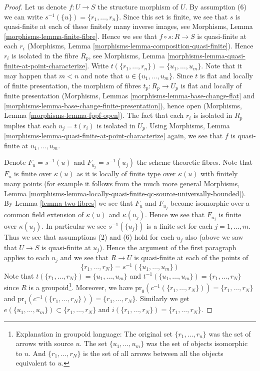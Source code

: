 \documentclass{stacks-project}
\theoremstyle{plain}
\theoremstyle{definition}
\theoremstyle{remark}
\numberwithin{equation}{subsection}
\begin{document}
\begin{proof}
Let us denote $f : U \to S$ the structure morphism of $U$.
By assumption (6) we can write $s^{-1}(\{u\}) = \{r_1, \ldots, r_n\}$.
Since this set is finite, we see that $s$ is quasi-finite at each of
these finitely many inverse images, see
Morphisms, Lemma \ref{morphisms-lemma-finite-fibre}.
Hence we see that $f \circ s : R \to S$ is quasi-finite at each $r_i$
(Morphisms, Lemma \ref{morphisms-lemma-composition-quasi-finite}).
Hence $r_i$ is isolated in the fibre $R_p$, see
Morphisms, Lemma \ref{morphisms-lemma-quasi-finite-at-point-characterize}.
Write $t(\{r_1, \ldots, r_n\}) = \{u_1, \ldots, u_m\}$.
Note that it may happen that $m < n$ and note that
$u \in \{u_1, \ldots, u_m\}$.
Since $t$ is flat and locally of finite presentation,
the morphism of fibres $t_p : R_p \to U_p$ is flat and locally of
finite presentation (Morphisms,
Lemmas \ref{morphisms-lemma-base-change-flat} and
\ref{morphisms-lemma-base-change-finite-presentation}),
hence open (Morphisms,
Lemma \ref{morphisms-lemma-fppf-open}).
The fact that each $r_i$ is isolated in $R_p$ implies that
each $u_j = t(r_i)$ is isolated in $U_p$. Using
Morphisms, Lemma \ref{morphisms-lemma-quasi-finite-at-point-characterize}
again, we see that $f$ is quasi-finite at $u_1, \ldots, u_m$.

\medskip\noindent
Denote $F_u = s^{-1}(u)$ and $F_{u_j} = s^{-1}(u_j)$ the scheme theoretic
fibres. Note that $F_u$ is finite over $\kappa(u)$ as it is locally of finite
type over $\kappa(u)$ with finitely many points (for example it follows from
the much more general
Morphisms, Lemma
\ref{morphisms-lemma-locally-quasi-finite-qc-source-universally-bounded}).
By
Lemma \ref{lemma-two-fibres}
we see that $F_u$ and $F_{u_j}$ become isomorphic over a common
field extension of $\kappa(u)$ and $\kappa(u_j)$. Hence we see
that $F_{u_j}$ is finite over $\kappa(u_j)$. In particular we see
$s^{-1}(\{u_j\})$ is a finite set for each $j = 1, \ldots, m$.
Thus we see that assumptions (2) and (6) hold for each $u_j$ also
(above we saw that $U \to S$ is quasi-finite at $u_j$).
Hence the argument of the first paragraph applies to each $u_j$
and we see that $R \to U$ is quasi-finite at each of the points of
$$
\{r_1, \ldots, r_N\} = s^{-1}(\{u_1, \ldots, u_m\})
$$
Note that $t(\{r_1, \ldots, r_N\}) = \{u_1, \ldots, u_m\}$ and
$t^{-1}(\{u_1, \ldots, u_m\}) = \{r_1, \ldots, r_N\}$
since $R$ is a groupoid\footnote{Explanation in groupoid language:
The original set $\{r_1, \ldots, r_n\}$ was the set of arrows with
source $u$. The set $\{u_1, \ldots, u_m\}$ was the set of objects
isomorphic to $u$. And $\{r_1, \ldots, r_N\}$ is the set of all arrows
between all the objects equivalent to $u$.}. Moreover, we have
$\text{pr}_0(c^{-1}(\{r_1, \ldots, r_N\})) = \{r_1, \ldots, r_N\}$
and
$\text{pr}_1(c^{-1}(\{r_1, \ldots, r_N\})) = \{r_1, \ldots, r_N\}$.
Similarly we get $e(\{u_1, \ldots, u_m\}) \subset \{r_1, \ldots, r_N\}$
and $i(\{r_1, \ldots, r_N\}) = \{r_1, \ldots, r_N\}$.


\end{proof}
\end{document}
